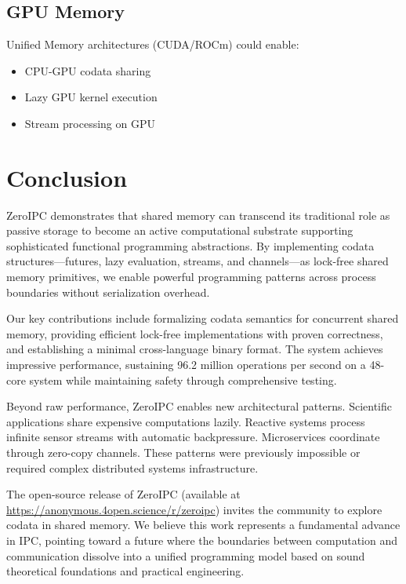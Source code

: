 \documentclass[letterpaper,twocolumn,10pt]{article}
\newcommand{\projectname}{ZeroIPC}
\newcommand{\projecturl}{\url{https://anonymous.4open.science/r/zeroipc}}
\begin{document}
\subsection{GPU Memory}

Unified Memory architectures (CUDA/ROCm) could enable:
\begin{itemize}
\item CPU-GPU codata sharing
\item Lazy GPU kernel execution
\item Stream processing on GPU
\end{itemize}

\section{Conclusion}

\projectname{} demonstrates that shared memory can transcend its traditional role as passive storage to become an active computational substrate supporting sophisticated functional programming abstractions. By implementing codata structures---futures, lazy evaluation, streams, and channels---as lock-free shared memory primitives, we enable powerful programming patterns across process boundaries without serialization overhead.

Our key contributions include formalizing codata semantics for concurrent shared memory, providing efficient lock-free implementations with proven correctness, and establishing a minimal cross-language binary format. The system achieves impressive performance, sustaining 96.2 million operations per second on a 48-core system while maintaining safety through comprehensive testing.

Beyond raw performance, \projectname{} enables new architectural patterns. Scientific applications share expensive computations lazily. Reactive systems process infinite sensor streams with automatic backpressure. Microservices coordinate through zero-copy channels. These patterns were previously impossible or required complex distributed systems infrastructure.

The open-source release of \projectname{} (available at \projecturl{}) invites the community to explore codata in shared memory. We believe this work represents a fundamental advance in IPC, pointing toward a future where the boundaries between computation and communication dissolve into a unified programming model based on sound theoretical foundations and practical engineering.

\balance



\end{document}
